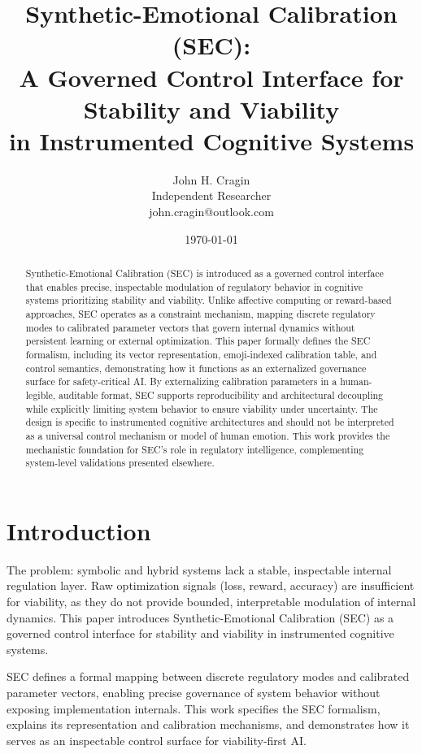 \documentclass[12pt,a4paper]{article}
\title{Synthetic-Emotional Calibration (SEC):\\
\Large A Governed Control Interface for Stability and Viability \\
\large in Instrumented Cognitive Systems}
\author{John H. Cragin\\
Independent Researcher\\
john.cragin@outlook.com}
\date{\today{}}
\begin{document}
\maketitle

\begin{abstract}
Synthetic-Emotional Calibration (SEC) is introduced as a governed control interface that enables precise, inspectable modulation of regulatory behavior in cognitive systems prioritizing stability and viability. Unlike affective computing or reward-based approaches, SEC operates as a constraint mechanism, mapping discrete regulatory modes to calibrated parameter vectors that govern internal dynamics without persistent learning or external optimization. This paper formally defines the SEC formalism, including its vector representation, emoji-indexed calibration table, and control semantics, demonstrating how it functions as an externalized governance surface for safety-critical AI. By externalizing calibration parameters in a human-legible, auditable format, SEC supports reproducibility and architectural decoupling while explicitly limiting system behavior to ensure viability under uncertainty. The design is specific to instrumented cognitive architectures and should not be interpreted as a universal control mechanism or model of human emotion. This work provides the mechanistic foundation for SEC's role in regulatory intelligence, complementing system-level validations presented elsewhere.
\end{abstract}

\section{Introduction}

The problem: symbolic and hybrid systems lack a stable, inspectable internal regulation layer. Raw optimization signals (loss, reward, accuracy) are insufficient for viability, as they do not provide bounded, interpretable modulation of internal dynamics. This paper introduces Synthetic-Emotional Calibration (SEC) as a governed control interface for stability and viability in instrumented cognitive systems.

SEC defines a formal mapping between discrete regulatory modes and calibrated parameter vectors, enabling precise governance of system behavior without exposing implementation internals. This work specifies the SEC formalism, explains its representation and calibration mechanisms, and demonstrates how it serves as an inspectable control surface for viability-first AI.
\end{document}
